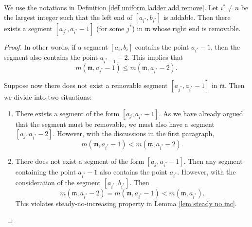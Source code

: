 \begin{proposition} \label{prop addable and removable}
We use the notations in Definition \ref{def uniform ladder add remove}. Let $i^*\neq n$ be the largest integer such that the left end of $[a_{i^*}, b_{i^*}]$ is addable. Then there exists a  segment $[a_{j^*}, a_{i^*}-1]$ (for some $j^*$) in $\mathfrak m$ whose right end is removable. 
\end{proposition}


\begin{proof}
In other words, if a segment $[a_i,b_i]$ contains the point $a_{i^*}-1$, then the segment also contains the point $a_{i^*-1}-2$. This implies that 
\[ m(\mathfrak m, a_{i^*}-1) \leq m(\mathfrak m, a_{i^*}-2). \] 

Suppose now there does not exist a removable segment $[a_{j^*}, a_{i^*}-1]$ in $\mathfrak m$. Then we divide into two situations:
\begin{enumerate}
\item[(a)] There exists a segment of the form $[a_{j}, a_{i^*}-1]$. As we have already argued that the segment must be removable, we must also have a segment $[a_{j}, a_{i^*}-2]$. However, with the discussions in the first paragraph, 
\[  m(\mathfrak m, a_{i^*}-1) < m(\mathfrak m, a_{i^*}-2). \] 
\item[(b)] There does not exist a segment of the form $[a_j, a_{i^*}-1]$. Then any segment containing the point $a_{i^*}-1$ also contains the point $a_{i^*}$. However, with the consideration of the segment $[a_{i^*}, b_{i^*}]$. Then 
\[  m(\mathfrak m, a_{i^*}-2)= m(\mathfrak m, a_{i^*}-1)  < m(\mathfrak m, a_{i^*}) .
\]
This violates steady-no-increasing property in Lemma \ref{lem steady no inc}.
\end{enumerate}



\end{proof}

